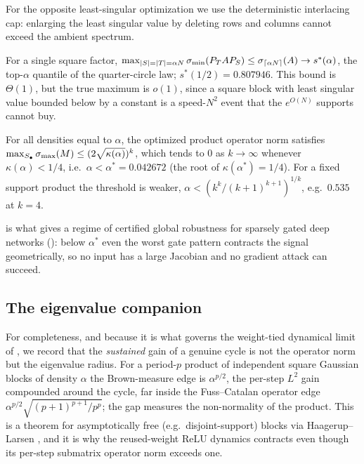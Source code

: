 For the opposite least-singular optimization we use the deterministic interlacing cap: enlarging the
least singular value by deleting rows and columns cannot exceed the ambient spectrum.

\begin{proposition}\label{prop:B5}
For a single square factor, $\max_{|S|=|T|=\alpha N}\sigma_{\min}(P_TAP_S)\le\sigma_{\lceil\alpha N\rceil}(A)\to s^*(\alpha)$,
the top-$\alpha$ quantile of the quarter-circle law; $s^*(1/2)=0.807946$. This bound is $\Theta(1)$, but
the true maximum is $o(1)$, since a square block with least singular value bounded below by a constant is a
speed-$N^2$ event that the $e^{O(N)}$ supports cannot buy.
\end{proposition}

\begin{proposition}\label{prop:contract}
For all densities equal to $\alpha$, the optimized product operator norm satisfies
$\max_{S_\bullet}\sigma_{\max}(M)\le(2\sqrt{\kappa(\alpha)})^k$, which tends to $0$ as $k\to\infty$ whenever
$\kappa(\alpha)<1/4$, i.e.\ $\alpha<\alpha^*=0.042672$ (the root of $\kappa(\alpha^*)=1/4$). For a fixed
support product the threshold is weaker, $\alpha<(k^k/(k+1)^{k+1})^{1/k}$, e.g.\ $0.535$ at $k=4$.
\end{proposition}

 is what gives a regime of certified global robustness for sparsely gated deep
networks (): below $\alpha^*$ even the worst gate pattern contracts the signal
geometrically, so no input has a large Jacobian and no gradient attack can succeed.

\subsection{The eigenvalue companion}
For completeness, and because it is what governs the weight-tied dynamical limit of ,
we record that the \emph{sustained} gain of a genuine cycle is not the operator norm but the
eigenvalue radius. For a period-$p$ product of independent square Gaussian blocks of density $\alpha$
the Brown-measure edge is $\alpha^{p/2}$, the per-step $L^2$ gain compounded around the cycle, far
inside the Fuss--Catalan operator edge $\alpha^{p/2}\sqrt{(p+1)^{p+1}/p^p}$; the gap measures the
non-normality of the product. This is a theorem for asymptotically free (e.g.\ disjoint-support)
blocks via Haagerup--Larsen \cite{shmaloProducts,relumap}, and it is why the reused-weight ReLU
dynamics contracts even though its per-step submatrix operator norm exceeds one.
